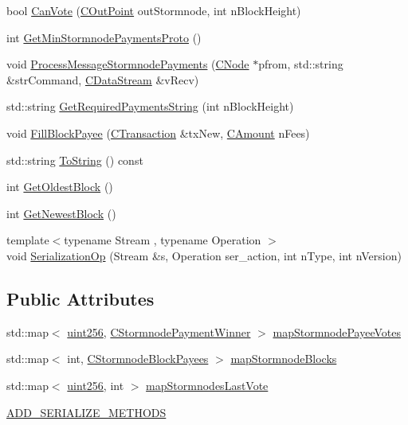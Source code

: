 \begin{DoxyCompactItemize}
\item 
bool \hyperlink{class_c_stormnode_payments_ae0765ade69bea1010c3f7482ea9d9beb}{Can\+Vote} (\hyperlink{class_c_out_point}{C\+Out\+Point} out\+Stormnode, int n\+Block\+Height)
\item 
int \hyperlink{class_c_stormnode_payments_a98392b86e945308c9c66f1cd4942a220}{Get\+Min\+Stormnode\+Payments\+Proto} ()
\item 
void \hyperlink{class_c_stormnode_payments_a8dc55316a297daad51a03d4cf7b37d06}{Process\+Message\+Stormnode\+Payments} (\hyperlink{class_c_node}{C\+Node} $\ast$pfrom, std\+::string \&str\+Command, \hyperlink{class_c_data_stream}{C\+Data\+Stream} \&v\+Recv)
\item 
std\+::string \hyperlink{class_c_stormnode_payments_a67088f0606e6b20c9d918a72db4ca2ff}{Get\+Required\+Payments\+String} (int n\+Block\+Height)
\item 
void \hyperlink{class_c_stormnode_payments_accaeb923fe36e73d4228fc043771c4ad}{Fill\+Block\+Payee} (\hyperlink{class_c_transaction}{C\+Transaction} \&tx\+New, \hyperlink{amount_8h_a4eaf3a5239714d8c45b851527f7cb564}{C\+Amount} n\+Fees)
\item 
std\+::string \hyperlink{class_c_stormnode_payments_abfe9298441cc4e90710d1ba8bc24ec57}{To\+String} () const 
\item 
int \hyperlink{class_c_stormnode_payments_a28bd6d48455d8825c94056725fb42c08}{Get\+Oldest\+Block} ()
\item 
int \hyperlink{class_c_stormnode_payments_a2d5b46ffba64492eaf4182bd3015d663}{Get\+Newest\+Block} ()
\item 
{\footnotesize template$<$typename Stream , typename Operation $>$ }\\void \hyperlink{class_c_stormnode_payments_a00b73c24ef476465db57c93a880343d6}{Serialization\+Op} (Stream \&s, Operation ser\+\_\+action, int n\+Type, int n\+Version)
\end{DoxyCompactItemize}
\subsection*{Public Attributes}
\begin{DoxyCompactItemize}
\item 
std\+::map$<$ \hyperlink{classuint256}{uint256}, \hyperlink{class_c_stormnode_payment_winner}{C\+Stormnode\+Payment\+Winner} $>$ \hyperlink{class_c_stormnode_payments_a2227618f68b1655073c17d4b2ffe1c56}{map\+Stormnode\+Payee\+Votes}
\item 
std\+::map$<$ int, \hyperlink{class_c_stormnode_block_payees}{C\+Stormnode\+Block\+Payees} $>$ \hyperlink{class_c_stormnode_payments_aad1a7055ea55caa06b4eb291e8b3a348}{map\+Stormnode\+Blocks}
\item 
std\+::map$<$ \hyperlink{classuint256}{uint256}, int $>$ \hyperlink{class_c_stormnode_payments_a82f9ee8e4388b9640854bd3c70b76782}{map\+Stormnodes\+Last\+Vote}
\item 
\hyperlink{class_c_stormnode_payments_aedb0752fb1e1cb758cfc2fd05d131c40}{A\+D\+D\+\_\+\+S\+E\+R\+I\+A\+L\+I\+Z\+E\+\_\+\+M\+E\+T\+H\+O\+D\+S}
\end{DoxyCompactItemize}


